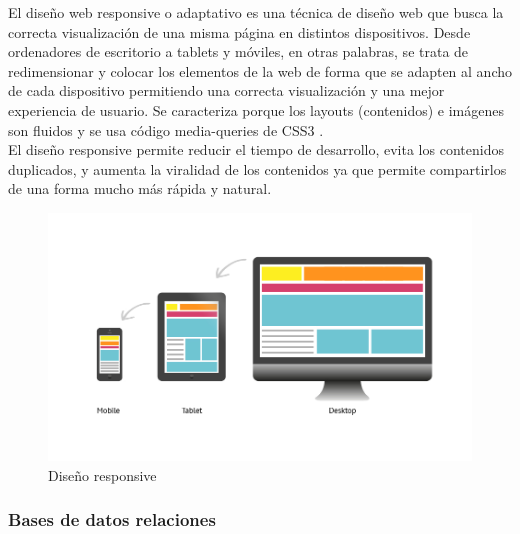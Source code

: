 		{El diseño web responsive o adaptativo es una técnica de diseño web que busca la correcta visualización de una misma página en distintos dispositivos. Desde ordenadores de escritorio a tablets y móviles, en otras palabras, se trata de redimensionar y colocar los elementos de la web de forma que se adapten al ancho de cada dispositivo permitiendo una correcta visualización y una mejor experiencia de usuario. Se caracteriza porque los layouts (contenidos) e imágenes son fluidos y se usa código media-queries de CSS3 \cite{responsive}.\\
			
		El diseño responsive permite reducir el tiempo de desarrollo, evita los contenidos duplicados, y aumenta la viralidad de los contenidos ya que permite compartirlos de una forma mucho más rápida y natural.
	
		\begin{figure}[H]
			\centering
			\includegraphics[width=0.8\linewidth]{description/framework/responsive.jpg}
			\caption{Diseño responsive}
		\end{figure}
		}
			
		
		\subsubsection{Bases de datos relaciones}
		
